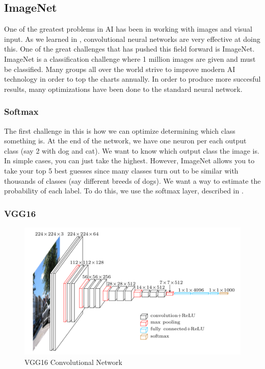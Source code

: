 \subsection{ImageNet}\label{s:imagenet}
One of the greatest problems in AI has been in working with images and visual input. As we learned in , convolutional neural networks are very effective at doing this. One of the great challenges that has pushed this field forward is ImageNet. ImageNet is a classification challenge where 1 million images are given and must be classified. Many groups all over the world strive to improve modern AI technology in order to top the charts annually. In order to produce more succesful results, many optimizations have been done to the standard neural network.

\subsubsection{Softmax}

The first challenge in this is how we can optimize determining which class something is. At the end of the network, we have one neuron per each output class (say 2 with dog and cat). We want to know which output class the image is. In simple cases, you can just take the highest. However, ImageNet allows you to take your top 5 best guesses since many classes turn out to be similar with thousands of classes (say different breeds of dogs). We want a way to estimate the probability of each label. To do this, we use the softmax layer, described in .

\subsubsection{VGG16}
\begin{figure}[H]
	\centering
	\includegraphics[scale=0.5]{images/vgg16}
	\caption{VGG16 Convolutional Network}
	\label{f:vgg16}
\end{figure}


